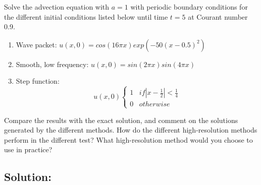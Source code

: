 Solve the advection equation with $a=1$ with periodic boundary conditions for the different initial conditions listed below until time $t=5$ at Courant number 0.9.
\begin{enumerate}
\item Wave packet: $u(x,0)=cos(16\pi x)exp(-50(x-0.5)^2)$
\item Smooth, low frequency: $u(x,0)=sin(2\pi x)sin(4\pi x)$
\item Step function: $$u(x,0)\begin{cases}
							1 \;\;\; if |x-\frac{1}{2}|<\frac{1}{4}\\
							0 \;\;\; otherwise
							\end{cases}$$						
\end{enumerate}
Compare the results with the exact solution, and comment on the solutions generated by the different methods. How do the different high-resolution methods perform in the different test? What high-resolution method would you choose to use in practice?
\subsection{Solution:}
